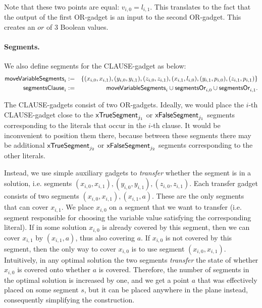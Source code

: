 Note that these two points are equal: $v_{i,0} = l_{i,1}$.
This translates to the fact that the output of the first OR-gadget
is an input to the second OR-gadget.
This creates an $or$ of 3 Boolean values.

\paragraph{Segments.}
We also define segments for the CLAUSE-gadget as below:
\begin{eqnarray*}
\mathsf{moveVariableSegments}_{i} & := & \{
(x_{i, 0}, x_{i, 1}),
(y_{i, 0}, y_{i, 1}),
(z_{i, 0}, z_{i, 1}),
(x_{i, 1}, l_{i, 0}),
(y_{i, 1}, p_{i, 0}),
(z_{i, 1}, p_{i, 1})
\} \\
\mathsf{segmentsClause}_i & := & \mathsf{moveVariableSegments}_{i} \cup \mathsf{segmentsOr}_{i,0} \cup \mathsf{segmentsOr}_{i,1}.
\end{eqnarray*}

\newcommand{\segmentsClauseSolTrue}[1]{\mathsf{solClause}^{\true,#1}}
\newcommand{\segmentsClauseSolFalse}{\mathsf{solClause}^{\false}}

The CLAUSE-gadgets consist of two OR-gadgets.
Ideally, we would place the $i$-th CLAUSE-gadget close to the
$\mathsf{xTrueSegment}_{j_1}$ or $\mathsf{xFalseSegment}_{j_1}$ segments
corresponding to the literals that occur in the $i$-th clause.
It would be inconvenient to position them there,
because between these segments there may be additional
$\mathsf{xTrueSegment}_{j_2}$ or $\mathsf{xFalseSegment}_{j_2}$
segments corresponding to the other literals.

Instead, we use simple auxiliary gadgets to
\textit{transfer} whether the segment
is in a solution, i.e. segments
$(x_{i, 0}, x_{i, 1}), (y_{i, 0}, y_{i, 1}), (z_{i, 0}, z_{i, 1})$.
Each transfer gadget consists of two segments $(x_{i, 0}, x_{i, 1}), (x_{i, 1}, a)$.
These are the only segments that can cover $x_{i,1}$.
We place $x_{i,0}$ on a segment that we want to transfer (i.e.
segment responsible for choosing the variable value satisfying the
corresponding literal).
If in some solution $x_{i,0}$ is already covered by this segment, then
we can cover $x_{i,1}$ by $(x_{i,1}, a)$, thus also covering $a$.
If $x_{i,0}$ is not covered by this segment,
then the only way to cover $x_{i,0}$ is to use segment $(x_{i, 0}, x_{i, 1})$.
Intuitively,
in any optimal solution the two segments \textit{transfer} the state of whether $x_{i,0}$
is covered onto whether $a$ is covered.
Therefore, the number of segments in the optimal solution is increased by one,
and we get a point $a$ that was effectively placed
on some segment $s$, but it can be placed anywhere in the plane instead,
consequently simplifying the construction.

